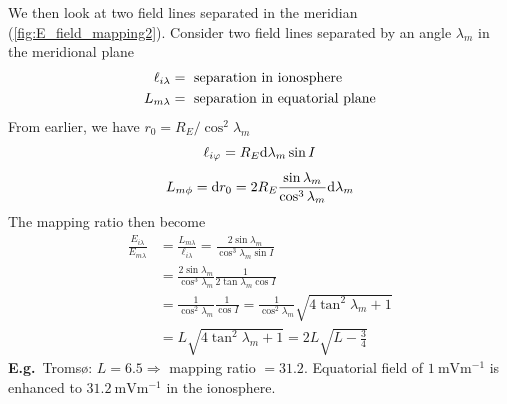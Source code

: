 We then look at two field lines separated in the meridian (\cref{fig:E_field_mapping2}). Consider two field lines separated by an angle \(\lambda_m\) in the meridional plane
\begin{align*}
    \ell_{i\lambda}&=\textnormal{ separation in ionosphere}\\
    L_{m\lambda}&=\textnormal{ separation in equatorial plane}
\end{align*}
From earlier, we have \(r_0=R_E/\cos^2\lambda_m\)
\begin{equation*}
    \ell_{i\varphi}=R_E\textnormal{d}\lambda_m\sin I
\end{equation*}
\begin{equation*}
    L_{m\phi}=\textnormal{d}r_0=2R_E\frac{\sin\lambda_m}{\cos^3\lambda_m}\textnormal{d}\lambda_m
\end{equation*}
The mapping ratio then become
\begin{align*}
    \frac{E_{i\lambda}}{E_{m\lambda}}&=\frac{L_{m\lambda}}{\ell_{i\lambda}}=\frac{2\sin\lambda_m}{\cos^3\lambda_m\sin I}\\
    &=\frac{2\sin\lambda_m}{\cos^3\lambda_m}\frac{1}{2\tan\lambda_m\cos I}\\
    &=\frac{1}{\cos^2\lambda_m}\frac{1}{\cos I}=\frac{1}{\cos^2\lambda_m}\sqrt{4\tan^2\lambda_m+1}\\
    &=L\sqrt{4\tan^2\lambda_m+1}=2L\sqrt{L-\frac{3}{4}}
\end{align*}
\textbf{E.g.}\ Tromsø: \(L=6.5\Rightarrow \) mapping ratio \(=31.2\). Equatorial field of \(\SI{1}{\milli\volt\metre^{-1}}\) is enhanced to \(\SI{31.2}{\milli\volt\metre^{-1}}\) in the ionosphere.

